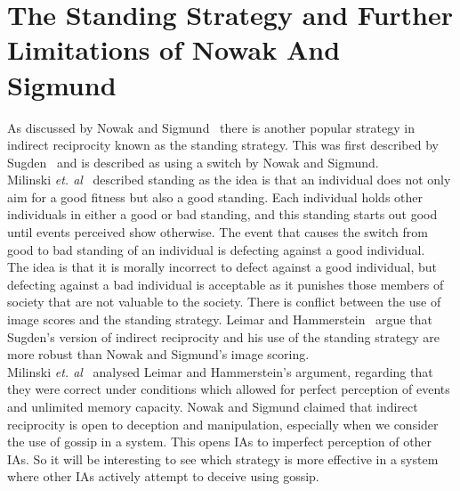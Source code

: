 \documentclass[]{final_report}
\begin{document}
\section{The Standing Strategy and Further Limitations of Nowak And Sigmund}
As discussed by Nowak and Sigmund~\cite{evol_indirect_image} there is another popular strategy in indirect reciprocity known as the standing strategy. This was first described by Sugden~\cite{sugden2004economics} and is described as using a switch by Nowak and Sigmund.\\
Milinski \textit{et. al}~\cite{imagevsstanding} described standing as the idea is that an individual does not only aim for a good fitness but also a good standing. Each individual holds other individuals in either a good or bad standing, and this standing starts out good until events perceived show otherwise. The event that causes the switch from good to bad standing of an individual is defecting against a good individual.\\
The idea is that it is morally incorrect to defect against a good individual, but defecting against a bad individual is acceptable as it punishes those members of society that are not valuable to the society. There is conflict between the use of image scores and the standing strategy. Leimar and Hammerstein~\cite{leimarhammer} argue that Sugden's version of indirect reciprocity and his use of the standing strategy are more robust than Nowak and Sigmund's image scoring.\\
Milinski \textit{et. al}~\cite{imagevsstanding} analysed Leimar and Hammerstein's argument, regarding that they were correct under conditions which allowed for perfect perception of events and unlimited memory capacity. Nowak and Sigmund claimed that indirect reciprocity is open to deception and manipulation, especially when we consider the use of gossip in a system. This opens IAs to imperfect perception of other IAs. So it will be interesting to see which strategy is more effective in a system where other IAs actively attempt to deceive using gossip.
\end{document}
